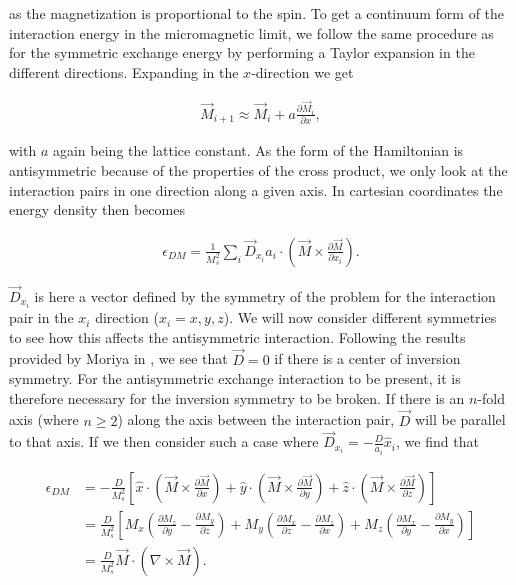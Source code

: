 \documentclass[1p]{elsarticle}		%
\numberwithin{equation}{section}
\begin{document}
as the magnetization is proportional to the spin. To get a continuum form of the interaction energy in the micromagnetic limit, we follow the same procedure as for the symmetric exchange energy by performing a Taylor expansion in the different directions. Expanding in the $x$-direction we get

\begin{align}
\vec{M}_{i+1} \approx \vec{M}_i + a\frac{\partial \vec{M}_i}{\partial x},
\end{align}

with $a$ again being the lattice constant. As the form of the Hamiltonian is antisymmetric because of the properties of the cross product, we only look at the interaction pairs in one direction along a given axis. In cartesian coordinates the energy density then becomes

\begin{align}
\epsilon_{DM} = \frac{1}{M_s^2}\sum_i\vec{D}_{x_i}a_i\cdot(\vec{M}\times\frac{\partial \vec{M}}{\partial x_i}).
\end{align}

$\vec{D}_{x_i}$ is here a vector defined by the symmetry of the problem for the interaction pair in the $x_i$ direction ($x_i = x, y, z$). We will now consider different symmetries to see how this affects the antisymmetric interaction. Following the results provided by Moriya in \cite{Moriya1960}, we see that $\vec{D} = 0$ if there is a center of inversion symmetry. For the antisymmetric exchange interaction to be present, it is therefore necessary for the inversion symmetry to be broken. If there is an $n$-fold axis (where $n\geq2$) along the axis between the interaction pair, $\vec{D}$ will be parallel to that axis. If we then consider such a case where $\vec{D}_{x_i} = -\frac{D}{a_i} \hat{x}_i$, we find that

\begin{align}
\nonumber \epsilon_{DM} &= -\frac{D}{M_s^2} \left[ \hat{x}\cdot(\vec{M}\times\frac{\partial\vec{M}}{\partial x}) + \hat{y}\cdot(\vec{M}\times\frac{\partial\vec{M}}{\partial y}) + \hat{z}\cdot (\vec{M}\times\frac{\partial\vec{M}}{\partial z})\right] \\
\nonumber &= \frac{D}{M_s^2}\left[M_x(\frac{\partial M_z}{\partial y} - \frac{\partial M_y}{\partial z}) + M_y(\frac{\partial M_x}{\partial z} - \frac{\partial M_z}{\partial x}) + M_z(\frac{\partial M_x}{\partial y} - \frac{\partial M_y}{\partial x})\right] \\
&= \frac{D}{M_s^2} \vec{M}\cdot(\nabla\times\vec{M}). \label{eq:BulkDMI}
\end{align}
\end{document}
